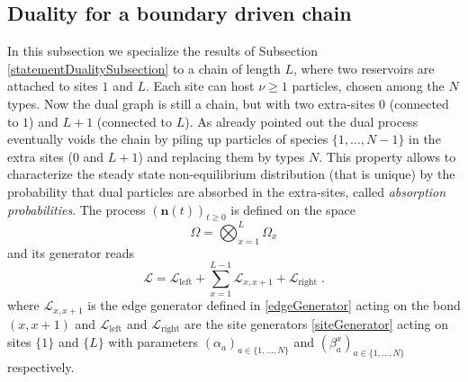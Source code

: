 \documentclass[10pt]{article}
\numberwithin{equation}{section}
\numberwithin{equation}{subsection}
\newcommand{\dt}{\;.}
\begin{document}
\subsection{Duality for a boundary driven chain}\label{Subsection-ss-nonI}
In this subsection we specialize the results of Subsection \ref{statementDualitySubsection} to a chain of length $L$, where two reservoirs are attached to sites $1$ and $L$. Each site can host $\nu\geq 1$ particles, chosen among the $N$ types. Now the dual graph is still a chain, but with two extra-sites $0$ (connected to $1$) and $L+1$ (connected to $L$). As already pointed out the dual process eventually voids the chain by piling up particles of species $\{1,\ldots,N-1\}$ in the extra sites ($0$ and $L+1$) and replacing them by types $N$. This property allows to characterize the steady state non-equilibrium distribution (that is unique) by the probability that dual particles are absorbed in the extra-sites, called \textit{absorption probabilities}. The process $\left(\bm{n}(t)\right)_{t\geq0}$ is defined on the space
\begin{equation}\label{stateSpace-Chain}
	\Omega=\bigotimes_{x=1}^{L} \Omega_{x}
\end{equation} and its generator reads
\begin{equation}
	\mathcal{L}=\mathcal{L}_{\text{left}}+\sum_{x=1}^{L-1}\mathcal{L}_{x,x+1}+\mathcal{L}_{\text{right}}\dt
\end{equation} 
where $\mathcal{L}_{x,x+1}$ is the edge generator defined in \eqref{edgeGenerator} acting on the bond $(x,x+1)$ and $\mathcal{L}_{\text{left}}$ and $\mathcal{L}_{\text{right}}$ are the site generators \eqref{siteGenerator} acting on sites $\{1\}$ and $\{L\}$ with parameters $(\alpha_{a})_{a\in \{1,\ldots,N\}}$ and $(\beta_{a}^{x})_{a\in \{1,\ldots,N\}}$ respectively. 
\begin{comment}
\begin{equation}
	\mathcal{L}_{x,x+1}f(\bm{n})=\sum_{a,b=0}^{N}n_{a}^{x}n_{b}^{x+1}\left(f(\bm{n}-\bm{\delta}_{a}^{x}+\bm{\delta}_{b}^{x}+\bm{\delta}_{a}^{x+1}-\bm{\delta}_{b}^{x+1})-f(\bm{n})\right)
\end{equation}
while at the boundaries 
\begin{equation}
	\mathcal{L}_{\text{left}}f(\bm{n})=\sum_{a,b=0}^{N}\alpha_{a}n_{b}^{1}\left(f(\bm{n}-\bm{\delta}_{b}^{x}+\bm{\delta}_{a}^{x})-f(\bm{n})\right)\qquad \mathcal{L}_{\text{right}}f(\bm{n})=\sum_{a,b=0}^{N}\beta_{a}n_{b}^{L}\left(f(\bm{n}-\bm{\delta}_{b}^{x}+\bm{\delta}_{a}^{x})-f(\bm{n})\right)\dt
\end{equation}
\end{comment}
\end{document}
